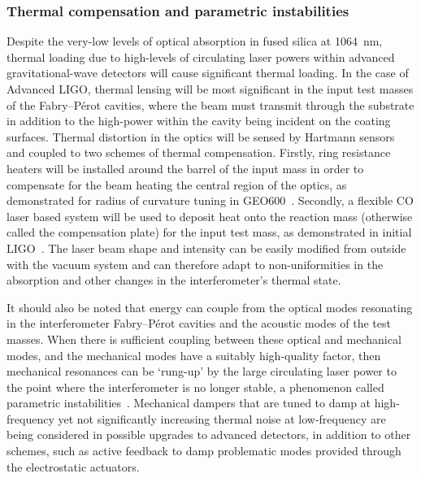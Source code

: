 \documentclass{article}
\begin{document}
\subsubsection{Thermal compensation and parametric instabilities}
\label{subsubsection:thermalcomp}

Despite the very-low levels of optical absorption in fused silica at 1064~nm,
thermal loading due to high-levels of circulating laser powers within
advanced gravitational-wave detectors will cause significant thermal loading. In
the case of Advanced LIGO, thermal lensing will be most significant in the input
test masses of the Fabry--P\'{e}rot cavities, where the beam must transmit through the
substrate in addition to the high-power within the cavity being incident on the
coating surfaces. Thermal distortion in the optics will be sensed by Hartmann
sensors and coupled to two schemes of thermal compensation. Firstly, ring
resistance heaters will be installed around the barrel of the input mass in
order to compensate for the beam heating the central region of the optics, as
demonstrated for radius of curvature tuning in GEO600~\cite{Luck:2004}.
Secondly, a flexible CO laser based system will be used to deposit heat onto
the reaction mass (otherwise called the compensation plate) for the input test
mass, as demonstrated in initial LIGO~\cite{Lawrence:2002,Waldman:2006}. The
laser beam shape and intensity can be easily modified from outside with the vacuum
system and can therefore adapt to non-uniformities in the absorption and other
changes in the interferometer's thermal state.

It should also be noted that energy can couple from the optical modes resonating
in the interferometer Fabry--P\'{e}rot cavities and the acoustic modes of the test
masses. When there is sufficient coupling between these optical and mechanical
modes, and the mechanical modes have a suitably high-quality factor, then
mechanical resonances can be `rung-up' by the large circulating laser power to
the point where the interferometer is no longer stable, a phenomenon called
parametric instabilities~\cite{Braginsky:2001}. Mechanical dampers that are
tuned to damp at high-frequency yet not significantly increasing thermal noise
at low-frequency are being considered in possible upgrades to advanced
detectors, in addition to other schemes, such as active feedback to damp
problematic modes provided through the electrostatic actuators.

\end{document}
